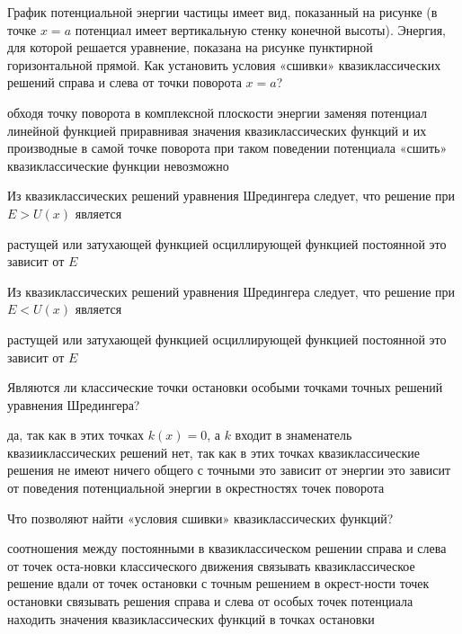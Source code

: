 \documentclass[11pt,a4paper]{exam}
\begin{document}
\begin{questions}
\question График потенциальной энергии частицы имеет вид, показанный на рисунке (в точке $x = a$ потенциал имеет вертикальную стенку конечной высоты). Энергия, для которой решается уравнение, показана на рисунке пунктирной горизонтальной прямой. Как установить условия «сшивки» квазиклассических решений справа и слева от точки поворота $x = a$?
\begin{choices}
\choice обходя точку поворота в комплексной плоскости энергии
\choice заменяя потенциал линейной функцией 
\choice приравнивая значения квазиклассических функций и их производные в самой точке поворота
\choice при таком поведении потенциала «сшить» квазиклассические функции невозможно 
\end{choices}

\question Из квазиклассических решений уравнения Шредингера следует, что решение при $E > U(x)$ является
\begin{choices}
\choice растущей или затухающей функцией    
\choice осциллирующей функцией
\choice постоянной              
\choice это зависит от $E$
\end{choices}

\question Из квазиклассических решений уравнения Шредингера следует, что решение при $E < U(x)$ является
\begin{choices}
\choice растущей или затухающей функцией
\choice осциллирующей функцией
\choice постоянной
\choice это зависит от $E$
\end{choices}

\question Являются ли классические точки остановки особыми точками точных решений уравнения Шредингера? 
\begin{choices}
\choice да, так как в этих точках $k(x) = 0$, а $k$ входит в знаменатель квазииклассических решений
\choice нет, так как в этих точках квазиклассические решения не имеют ничего общего с точными
\choice это зависит от энергии
\choice это зависит от поведения потенциальной энергии в окрестностях точек поворота 
\end{choices}

\question Что позволяют найти «условия сшивки» квазиклассических функций?
\begin{choices}
\choice соотношения между постоянными в квазиклассическом решении справа и слева от точек оста-новки классического движения
\choice связывать квазиклассическое решение вдали от точек остановки с точным решением в окрест-ности точек остановки
\choice связывать решения справа и слева от особых точек потенциала
\choice находить значения квазиклассических функций в точках остановки
\end{choices}


\end{questions}
\end{document}
